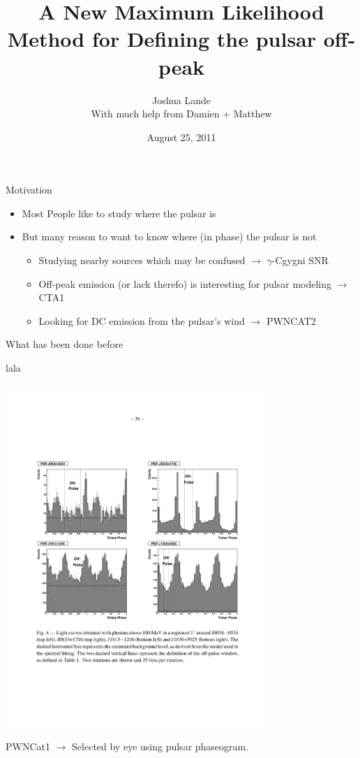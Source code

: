 \documentclass[12pt]{beamer}
\title{A New Maximum Likelihood Method for Defining the pulsar off-peak}
\author{Joshua Lande\\[1em]
With much help from Damien + Matthew}
\institute{SLAC/Stanford}
\date{August 25, 2011}
\begin{document}
\fermititle

\begin{frame}{Motivation}
  \begin{itemize}
    \item Most People like to study where the pulsar is
    \item But many reason to want to know where (in phase) the pulsar is not
      \begin{itemize}
        \item Studying nearby sources which may be confused $\rightarrow$ $\gamma$-Cgygni SNR
        \item Off-peak emission (or lack therefo) is interesting for pulsar modeling  $\rightarrow$ CTA1
        \item Looking for DC emission from the pulsar's wind $\rightarrow$ PWNCAT2
      \end{itemize}
  \end{itemize}
\end{frame}

\begin{frame}{What has been done before}

  lala

  \includegraphics[width=0.75\textwidth]{plots/off_pulse_pwncat1.pdf}

  PWNCat1 $\rightarrow$ Selected by eye using pulsar phaseogram.
\end{frame}
\end{document}

